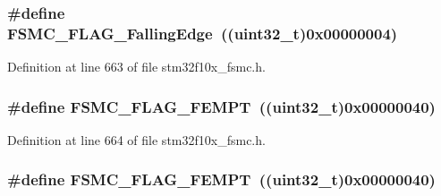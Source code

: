 \subsubsection[{\texorpdfstring{F\+S\+M\+C\+\_\+\+F\+L\+A\+G\+\_\+\+Falling\+Edge}{FSMC_FLAG_FallingEdge}}]{\setlength{\rightskip}{0pt plus 5cm}\#define F\+S\+M\+C\+\_\+\+F\+L\+A\+G\+\_\+\+Falling\+Edge~(({\bf uint32\+\_\+t})0x00000004)}\hypertarget{group___f_s_m_c___flags_gaaaa85bce06ed962874686ad7af0f0cb7}{}\label{group___f_s_m_c___flags_gaaaa85bce06ed962874686ad7af0f0cb7}


Definition at line 663 of file stm32f10x\+\_\+fsmc.\+h.

\subsubsection[{\texorpdfstring{F\+S\+M\+C\+\_\+\+F\+L\+A\+G\+\_\+\+F\+E\+M\+PT}{FSMC_FLAG_FEMPT}}]{\setlength{\rightskip}{0pt plus 5cm}\#define F\+S\+M\+C\+\_\+\+F\+L\+A\+G\+\_\+\+F\+E\+M\+PT~(({\bf uint32\+\_\+t})0x00000040)}\hypertarget{group___f_s_m_c___flags_ga8da2bd0b9d11877aaebaba0c77e8b0cc}{}\label{group___f_s_m_c___flags_ga8da2bd0b9d11877aaebaba0c77e8b0cc}


Definition at line 664 of file stm32f10x\+\_\+fsmc.\+h.

\subsubsection[{\texorpdfstring{F\+S\+M\+C\+\_\+\+F\+L\+A\+G\+\_\+\+F\+E\+M\+PT}{FSMC_FLAG_FEMPT}}]{\setlength{\rightskip}{0pt plus 5cm}\#define F\+S\+M\+C\+\_\+\+F\+L\+A\+G\+\_\+\+F\+E\+M\+PT~(({\bf uint32\+\_\+t})0x00000040)}\hypertarget{group___f_s_m_c___flags_ga8da2bd0b9d11877aaebaba0c77e8b0cc}{}\label{group___f_s_m_c___flags_ga8da2bd0b9d11877aaebaba0c77e8b0cc}


